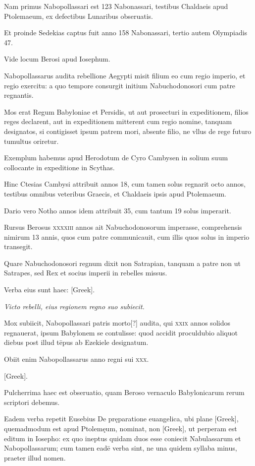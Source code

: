 \begin{parnumbers}
Nam primus Nabopollassari est 123 Nabonassari,
testibus Chaldaeis apud Ptolemaeum, ex defectibus Lunaribus
obseruatis.

Et proinde Sedekias captus fuit anno 158 Nabonassari,
tertio autem Olympiadis 47.

Vide locum Berosi apud Iosephum.

Nabopollassarus audita rebellione Aegypti misit filium eo
cum regio imperio, et regio exercitu: a quo tempore consurgit initium
Nabuchodonosori cum patre regnantis.

Mos erat Regum Babyloniae
et Persidis, ut aut prosecturi in expeditionem, filios reges declarent,
aut in expeditionem mitterent cum regio nomine, tanquam
designatos, si contigisset ipsum patrem mori, absente filio, ne
vllus de rege futuro tumultus oriretur.

Exemplum habemus apud
Herodotum de Cyro Cambysen in solium suum collocante in expeditione
in Scythas.

Hinc Ctesias Cambysi attribuit annos 18,
cum tamen solus regnarit octo annos, testibus omnibus veteribus
Graecis, et Chaldaeis ipsis apud Ptolemaeum.

Dario vero Notho annos
idem attribuit 35, cum tantum 19 solus imperarit.

Rursus Berosus
\textsc{xxxxiii} annos ait Nabuchodonosorum imperasse, comprehensis
nimirum 13 annis, quos cum patre communicauit, cum
illis quos solus in imperio transegit.

Quare Nabuchodonosori regnum
dixit non Satrapian, tanquam a patre non ut Satrapes, sed Rex
et socius imperii in rebelles missus.

Verba eius sunt haec: \textgreek{[Greek]}.

\textit{Victo rebelli, eius regionem regno suo subiecit.}

Mox subiicit, Nabopollassari patris morto[?]
audita, qui \textsc{xxix} annos solidos regnauerat, ipsum Babylonem se
contulisse: quod accidit proculdubio aliquot diebus post illud tēpus
ab Ezekiele designatum.

Obiit enim Nabopollassarus anno regni
sui \textsc{xxx}.

\textgreek{[Greek]}.

Pulcherrima haec est obseruatio, quam Beroso vernaculo
Babylonicarum rerum scriptori debemus.

Eadem verba repetit Eusebius
De pręparatione euangelica, ubi plane \textgreek{[Greek]}, quemadmodum
est apud Ptolemęum, nominat, non \textgreek{[Greek]}, ut perperam
est editum in Iosepho: ex quo ineptus quidam duos esse coniecit
Nabulassarum et Nabopollassarum; cum tamen eadē verba sint, ne
una quidem syllaba minus, praeter illud nomen.


\end{parnumbers}

